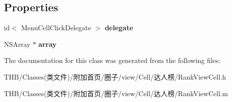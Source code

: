 \subsection*{Properties}
\begin{DoxyCompactItemize}
\item 
\mbox{\label{interface_rank_view_cell_a541da9156dd359ba33dcf326b16c7506}} 
id$<$ Menu\+Cell\+Click\+Delegate $>$ {\bfseries delegate}
\item 
\mbox{\label{interface_rank_view_cell_a0ada774a7594710db43b28c8270963ee}} 
N\+S\+Array $\ast$ {\bfseries array}
\end{DoxyCompactItemize}


The documentation for this class was generated from the following files\+:\begin{DoxyCompactItemize}
\item 
T\+H\+B/\+Classes(类文件)/附加首页/圈子/view/\+Cell/达人榜/Rank\+View\+Cell.\+h\item 
T\+H\+B/\+Classes(类文件)/附加首页/圈子/view/\+Cell/达人榜/Rank\+View\+Cell.\+m\end{DoxyCompactItemize}
